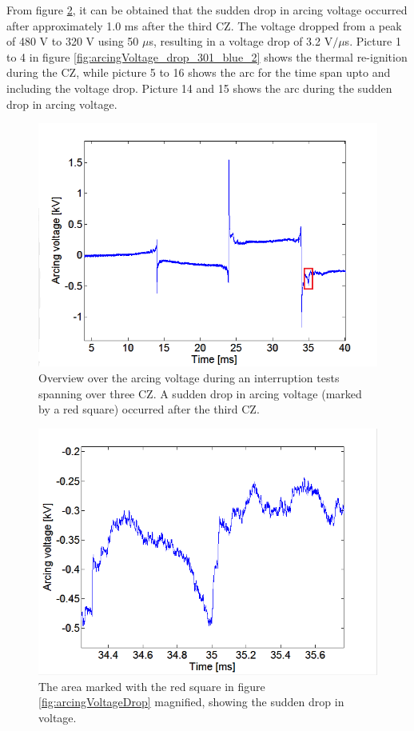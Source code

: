 \documentclass[10pt,b5paper,twoside]{article}
\begin{document}
From figure \ref{fig:arcingVoltageDrop_zoomed_2}, it can be obtained that the sudden drop in arcing voltage occurred after approximately 1.0 ms after the third CZ. The voltage dropped from a peak of 480 V to 320 V using 50 $\mu$s, resulting in a voltage drop of 3.2 V$/  \mu$s. Picture 1 to 4 in figure \ref{fig:arcingVoltage_drop_301_blue_2} shows the thermal re-ignition during the CZ, while picture 5 to 16 shows the arc for the time span upto and including the voltage drop. Picture 14 and 15 shows the arc during the sudden drop in arcing voltage.

\begin{figure}[H]
\centering
\includegraphics[scale=0.6, angle =0 ]{Bilder/Results/overviewArcingVoltageDrop_2.PNG}
\caption{Overview over the arcing voltage during an interruption tests spanning over three CZ. A sudden drop in arcing voltage (marked by a red square) occurred after the third CZ.} \label{fig:arcingVoltageDrop_2}
\end{figure}

\begin{figure}[H]
\centering
\includegraphics[scale=0.6, angle =0 ]{Bilder/Results/zoomArcingVoltageDrop_2.PNG}
\caption{The area marked with the red square in figure \ref{fig:arcingVoltageDrop} magnified, showing the sudden drop in voltage.} \label{fig:arcingVoltageDrop_zoomed_2}
\end{figure}
\end{document}
